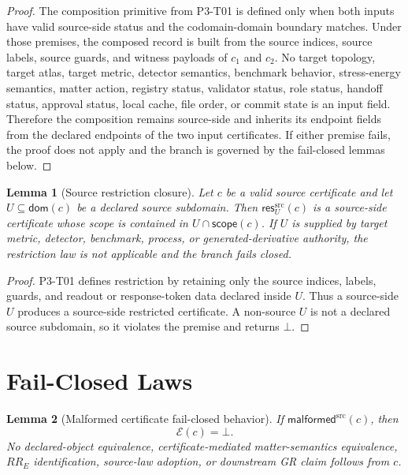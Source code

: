 \documentclass[11pt]{article}
\newcommand{\Cdom}{\mathsf{dom}}
\newcommand{\CRes}{\mathsf{res}^{\mathrm{src}}}
\newcommand{\CMalformed}{\mathsf{malformed}^{\mathrm{src}}}
\newcommand{\Bottom}{\bot}
\newcommand{\Scope}{\mathsf{scope}}
\newtheorem{lemma}{Lemma}
\begin{document}
\begin{proof}
The composition primitive from P3-T01 is defined only when both inputs have
valid source-side status and the codomain-domain boundary matches. Under
those premises, the composed record is built from the source indices, source
labels, source guards, and witness payloads of \(c_1\) and \(c_2\). No target
topology, target atlas, target metric, detector semantics, benchmark
behavior, stress-energy semantics, matter action, registry status, validator
status, role status, handoff status, approval status, local cache, file order,
or commit state is an input field. Therefore the composition remains
source-side and inherits its endpoint fields from the declared endpoints of
the two input certificates. If either premise fails, the proof does not apply
and the branch is governed by the fail-closed lemmas below.
\end{proof}

\begin{lemma}[Source restriction closure]
Let \(c\) be a valid source certificate and let \(U\subseteq\Cdom(c)\) be a
declared source subdomain. Then \(\CRes_U(c)\) is a source-side certificate
whose scope is contained in \(U\cap\Scope(c)\). If \(U\) is supplied by target
metric, detector, benchmark, process, or generated-derivative authority, the
restriction law is not applicable and the branch fails closed.
\end{lemma}

\begin{proof}
P3-T01 defines restriction by retaining only the source indices, labels,
guards, and readout or response-token data declared inside \(U\). Thus a
source-side \(U\) produces a source-side restricted certificate. A non-source
\(U\) is not a declared source subdomain, so it violates the premise and
returns \(\Bottom\).
\end{proof}

\section{Fail-Closed Laws}

\begin{lemma}[Malformed certificate fail-closed behavior]
If \(\CMalformed(c)\), then
\[
  \mathcal E(c)=\Bottom.
\]
No declared-object equivalence, certificate-mediated matter-semantics
equivalence, \(RR_E\) identification, source-law adoption, or downstream GR
claim follows from \(c\).
\end{lemma}
\end{document}
